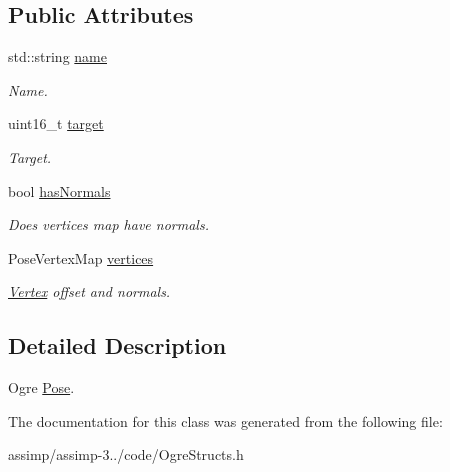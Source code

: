 \subsection*{Public Attributes}
\begin{DoxyCompactItemize}
\item 
\hypertarget{class_assimp_1_1_ogre_1_1_pose_a4c988dd7f0974a96dfa5f2dcd1e80e1d}{std\+::string \hyperlink{class_assimp_1_1_ogre_1_1_pose_a4c988dd7f0974a96dfa5f2dcd1e80e1d}{name}}\label{class_assimp_1_1_ogre_1_1_pose_a4c988dd7f0974a96dfa5f2dcd1e80e1d}

\begin{DoxyCompactList}\small\item\em Name. \end{DoxyCompactList}\item 
\hypertarget{class_assimp_1_1_ogre_1_1_pose_afdfc592eaf1f3f85ae1acbd169771c1d}{uint16\+\_\+t \hyperlink{class_assimp_1_1_ogre_1_1_pose_afdfc592eaf1f3f85ae1acbd169771c1d}{target}}\label{class_assimp_1_1_ogre_1_1_pose_afdfc592eaf1f3f85ae1acbd169771c1d}

\begin{DoxyCompactList}\small\item\em Target. \end{DoxyCompactList}\item 
\hypertarget{class_assimp_1_1_ogre_1_1_pose_a2bf30cd7de1b8d88404a6f7c0fe22be6}{bool \hyperlink{class_assimp_1_1_ogre_1_1_pose_a2bf30cd7de1b8d88404a6f7c0fe22be6}{has\+Normals}}\label{class_assimp_1_1_ogre_1_1_pose_a2bf30cd7de1b8d88404a6f7c0fe22be6}

\begin{DoxyCompactList}\small\item\em Does vertices map have normals. \end{DoxyCompactList}\item 
\hypertarget{class_assimp_1_1_ogre_1_1_pose_a98a8aac7f8693144dd683585208054fa}{Pose\+Vertex\+Map \hyperlink{class_assimp_1_1_ogre_1_1_pose_a98a8aac7f8693144dd683585208054fa}{vertices}}\label{class_assimp_1_1_ogre_1_1_pose_a98a8aac7f8693144dd683585208054fa}

\begin{DoxyCompactList}\small\item\em \hyperlink{struct_assimp_1_1_ogre_1_1_pose_1_1_vertex}{Vertex} offset and normals. \end{DoxyCompactList}\end{DoxyCompactItemize}


\subsection{Detailed Description}
Ogre \hyperlink{class_assimp_1_1_ogre_1_1_pose}{Pose}. 

The documentation for this class was generated from the following file\+:\begin{DoxyCompactItemize}
\item 
assimp/assimp-\/3../code/Ogre\+Structs.\+h\end{DoxyCompactItemize}
